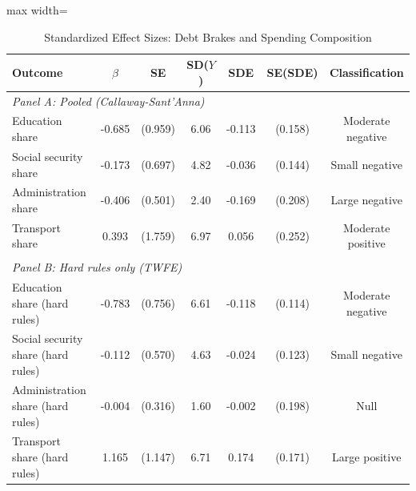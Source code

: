 \begin{table}[htbp]
\centering
\caption{Standardized Effect Sizes: Debt Brakes and Spending Composition}
\label{tab:sde}
\begin{adjustbox}{max width=\textwidth}
\begin{tabular}{lcccccc}
\hline\hline
Outcome & $\hat{\beta}$ & SE & SD($Y$) & SDE & SE(SDE) & Classification \\
\hline
\multicolumn{7}{l}{\textit{Panel A: Pooled (Callaway-Sant'Anna)}} \\
Education share & -0.685 & (0.959) & 6.06 & -0.113 & (0.158) & Moderate negative \\
Social security share & -0.173 & (0.697) & 4.82 & -0.036 & (0.144) & Small negative \\
Administration share & -0.406 & (0.501) & 2.40 & -0.169 & (0.208) & Large negative \\
Transport share & 0.393 & (1.759) & 6.97 & 0.056 & (0.252) & Moderate positive \\
 & & & & & & \\
\multicolumn{7}{l}{\textit{Panel B: Hard rules only (TWFE)}} \\
Education share (hard rules) & -0.783 & (0.756) & 6.61 & -0.118 & (0.114) & Moderate negative \\
Social security share (hard rules) & -0.112 & (0.570) & 4.63 & -0.024 & (0.123) & Small negative \\
Administration share (hard rules) & -0.004 & (0.316) & 1.60 & -0.002 & (0.198) & Null \\
Transport share (hard rules) & 1.165 & (1.147) & 6.71 & 0.174 & (0.171) & Large positive \\
\hline\hline

\end{tabular}
\end{adjustbox}
\end{table}
